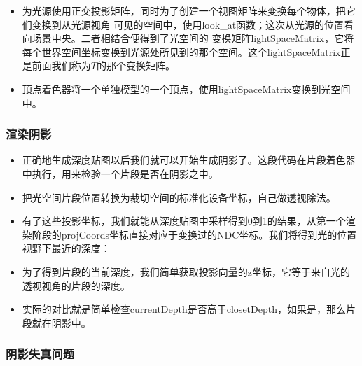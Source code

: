 \documentclass{article}
\begin{document}
  \begin{itemize}
	\item 为光源使用正交投影矩阵，同时为了创建一个视图矩阵来变换每个物体，把它们变换到从光源视角
	可见的空间中，使用look\_at函数；这次从光源的位置看向场景中央。二者相结合便得到了光空间的
	变换矩阵lightSpaceMatrix，它将每个世界空间坐标变换到光源处所见到的那个空间。这个lightSpaceMatrix正是前面我们称为$T$的那个变换矩阵。
\end{itemize}

  \begin{itemize}
	\item 顶点着色器将一个单独模型的一个顶点，使用lightSpaceMatrix变换到光空间中。
\end{itemize}

	\subsubsection{渲染阴影}
	  \begin{itemize}
		\item 正确地生成深度贴图以后我们就可以开始生成阴影了。这段代码在片段着色器中执行，用来检验一个片段是否在阴影之中。
	\end{itemize}
	  \begin{itemize}
	\item 把光空间片段位置转换为裁切空间的标准化设备坐标，自己做透视除法。
\end{itemize}

  \begin{itemize}
	\item 有了这些投影坐标，我们就能从深度贴图中采样得到0到1的结果，从第一个渲染阶段的projCoords坐标直接对应于变换过的NDC坐标。我们将得到光的位置视野下最近的深度：
\end{itemize}

  \begin{itemize}
	\item 为了得到片段的当前深度，我们简单获取投影向量的z坐标，它等于来自光的透视视角的片段的深度。
\end{itemize}

  \begin{itemize}
	\item 实际的对比就是简单检查currentDepth是否高于closetDepth，如果是，那么片段就在阴影中。
\end{itemize}

	\subsubsection{阴影失真问题}
	
\end{document}
